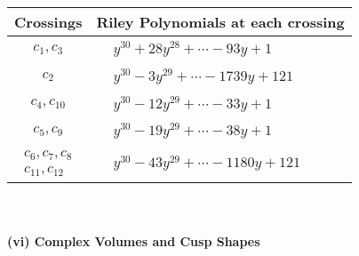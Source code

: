 \documentclass[1p]{elsarticle_modified}
\theoremstyle{definition}
\begin{document}
\begin{tabular}{m{50pt}|m{274pt}}
Crossings & \hspace{64pt}Riley Polynomials at each crossing \\
\hline $$\begin{aligned}c_{1},c_{3}\end{aligned}$$&$\begin{aligned}
&y^{30}+28 y^{28}+\cdots-93 y+1
\end{aligned}$\\
\hline $$\begin{aligned}c_{2}\end{aligned}$$&$\begin{aligned}
&y^{30}-3 y^{29}+\cdots-1739 y+121
\end{aligned}$\\
\hline $$\begin{aligned}c_{4},c_{10}\end{aligned}$$&$\begin{aligned}
&y^{30}-12 y^{29}+\cdots-33 y+1
\end{aligned}$\\
\hline $$\begin{aligned}c_{5},c_{9}\end{aligned}$$&$\begin{aligned}
&y^{30}-19 y^{29}+\cdots-38 y+1
\end{aligned}$\\
\hline $$\begin{aligned}c_{6},c_{7},c_{8}\\c_{11},c_{12}\end{aligned}$$&$\begin{aligned}
&y^{30}-43 y^{29}+\cdots-1180 y+121
\end{aligned}$\\
\hline
\end{tabular}\\~\\
\newpage\flushleft \textbf{(vi) Complex Volumes and Cusp Shapes}
\end{document}
